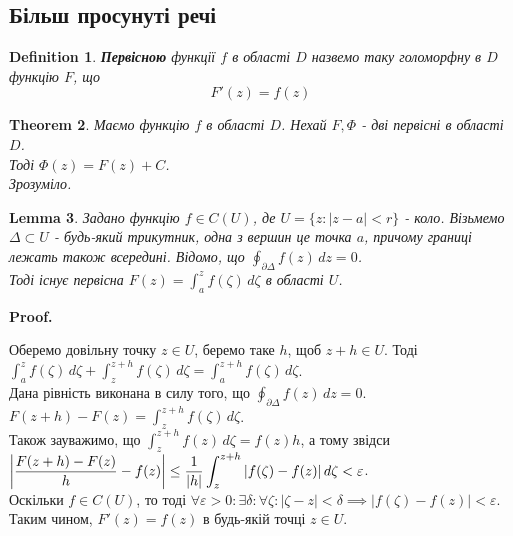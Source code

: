 \documentclass[a4paper, 10pt]{article}
\makeatletter
\def\qed{$\blacksquare$}
\theoremstyle{theoremdd}
\newtheorem{theorem}{Theorem}[subsection]
\theoremstyle{theoremdd}
\newtheorem{definition}[theorem]{Definition}
\theoremstyle{theoremdd}
\theoremstyle{theoremdd}
\theoremstyle{theoremdd}
\theoremstyle{theoremdd}
\theoremstyle{theoremdd}
\newtheorem{lemma}[theorem]{Lemma}
\theoremstyle{theoremdd}
\renewenvironment{proof}[1][Proof.\\]{\par
\pushQED{\hfill \qed}%
\normalfont \topsep6\p@\@plus6\p@\relax
\trivlist
\item\relax
{\bfseries
#1\@addpunct{.}}\hspace\labelsep\ignorespaces
}{%
\popQED\endtrivlist\@endpefalse
}
\makeatother
\begin{document}
\subsection*{Більш просунуті речі}
\begin{definition}
\textbf{Первісною} функції $f$ в області $D$ назвемо таку голоморфну в $D$ функцію $F$, що $$ F'(z) = f(z)$$
\end{definition}

\begin{theorem}
Маємо функцію $f$ в області $D$. Нехай $F,\Phi$ - дві первісні в області $D$.\\
Тоді $\Phi(z) = F(z) + C$.\\
\textit{Зрозуміло.}
\end{theorem}

\begin{lemma}
Задано функцію $f \in C(U)$, де $U = \{z: |z-a| < r\}$ - коло. Візьмемо $\Delta \subset U$ - будь-який трикутник, одна з вершин це точка $a$, причому границі лежать також всередині. Відомо, що $\displaystyle\oint_{\partial \Delta} f(z)\,dz = 0$.\\
Тоді існує первісна $F(z) = \displaystyle\int_a^z f(\zeta)\,d\zeta$ в області $U$.
\end{lemma}

\begin{proof}
\begin{figure}[H]
\centering
{}
\end{figure}
Оберемо довільну точку $z \in U$, беремо таке $h$, щоб $z+h \in U$. Тоді\\
$\displaystyle\int_a^z f(\zeta)\,d\zeta + \int_z^{z+h} f(\zeta)\,d\zeta = \int_a^{z+h} f(\zeta)\,d\zeta$.\\
Дана рівність виконана в силу того, що $\displaystyle\oint_{\partial \Delta} f(z)\,dz = 0$.\\
$F(z+h)-F(z) = \displaystyle\int_z^{z+h}f(\zeta)\,d\zeta$.\\
Також зауважимо, що $\displaystyle\int_z^{z+h} f(z)\,d\zeta = f(z)h$, а тому звідси\\
$\abs{\dfrac{F(z+h)-F(z)}{h}-f(z)} \leq \dfrac{1}{|h|} \displaystyle\int_z^{z+h} |f(\zeta) - f(z)|\,d\zeta < \varepsilon$.\\
Оскільки $f \in C(U)$, то тоді $\forall \varepsilon > 0: \exists \delta: \forall \zeta: |\zeta-z| < \delta \implies |f(\zeta)-f(z)| < \varepsilon$.\\
Таким чином, $F'(z) = f(z)$ в будь-якій точці $z \in U$.
\end{proof}
\end{document}
